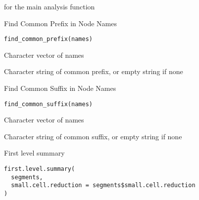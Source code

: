 \documentclass[a4paper]{book}
\begin{document}
%
\begin{SeeAlso}
 for the main analysis function
\end{SeeAlso}
%
\begin{Description}
Find Common Prefix in Node Names
\end{Description}
%
\begin{Usage}
\begin{verbatim}
find_common_prefix(names)
\end{verbatim}
\end{Usage}
%
\begin{Arguments}
\begin{ldescription}
\item[\code{names}] Character vector of names
\end{ldescription}
\end{Arguments}
%
\begin{Value}
Character string of common prefix, or empty string if none
\end{Value}
%
\begin{Description}
Find Common Suffix in Node Names
\end{Description}
%
\begin{Usage}
\begin{verbatim}
find_common_suffix(names)
\end{verbatim}
\end{Usage}
%
\begin{Arguments}
\begin{ldescription}
\item[\code{names}] Character vector of names
\end{ldescription}
\end{Arguments}
%
\begin{Value}
Character string of common suffix, or empty string if none
\end{Value}
%
\begin{Description}
First level summary
\end{Description}
%
\begin{Usage}
\begin{verbatim}
first.level.summary(
  segments,
  small.cell.reduction = segments$small.cell.reduction
)
\end{verbatim}
\end{Usage}
\end{document}
